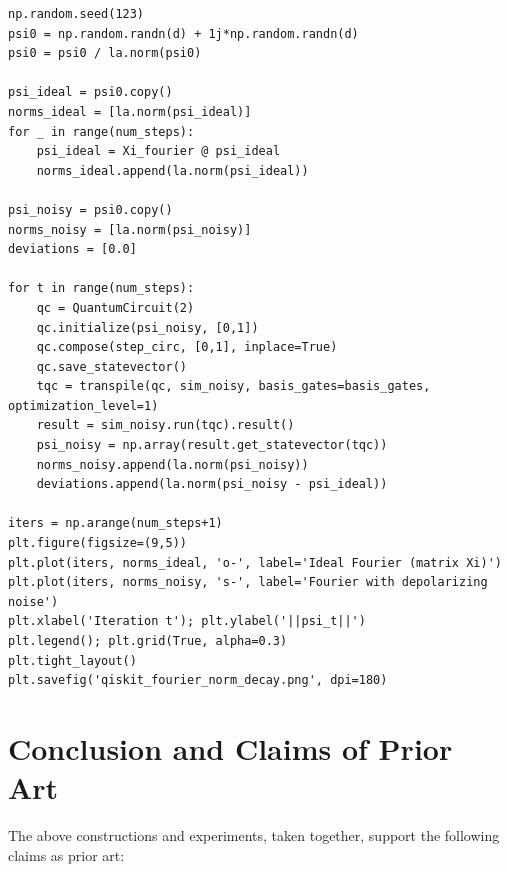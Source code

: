 \documentclass[11pt]{article}
\begin{document}
\begin{verbatim}
np.random.seed(123)
psi0 = np.random.randn(d) + 1j*np.random.randn(d)
psi0 = psi0 / la.norm(psi0)

psi_ideal = psi0.copy()
norms_ideal = [la.norm(psi_ideal)]
for _ in range(num_steps):
    psi_ideal = Xi_fourier @ psi_ideal
    norms_ideal.append(la.norm(psi_ideal))

psi_noisy = psi0.copy()
norms_noisy = [la.norm(psi_noisy)]
deviations = [0.0]

for t in range(num_steps):
    qc = QuantumCircuit(2)
    qc.initialize(psi_noisy, [0,1])
    qc.compose(step_circ, [0,1], inplace=True)
    qc.save_statevector()
    tqc = transpile(qc, sim_noisy, basis_gates=basis_gates, optimization_level=1)
    result = sim_noisy.run(tqc).result()
    psi_noisy = np.array(result.get_statevector(tqc))
    norms_noisy.append(la.norm(psi_noisy))
    deviations.append(la.norm(psi_noisy - psi_ideal))

iters = np.arange(num_steps+1)
plt.figure(figsize=(9,5))
plt.plot(iters, norms_ideal, 'o-', label='Ideal Fourier (matrix Xi)')
plt.plot(iters, norms_noisy, 's-', label='Fourier with depolarizing noise')
plt.xlabel('Iteration t'); plt.ylabel('||psi_t||')
plt.legend(); plt.grid(True, alpha=0.3)
plt.tight_layout()
plt.savefig('qiskit_fourier_norm_decay.png', dpi=180)
\end{verbatim}

\section{Conclusion and Claims of Prior Art}

The above constructions and experiments, taken together, support the following claims as prior art:
\end{document}
